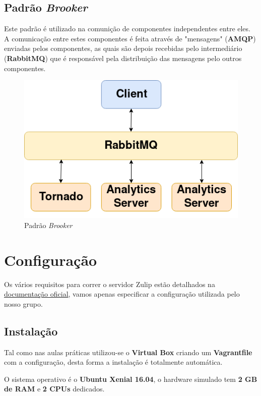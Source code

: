 \documentclass[11pt,a4paper]{report}%
\begin{document}
\section{Padrão \textit{Brooker}}

Este padrão é utilizado na comunição de componentes independentes entre eles. A comunicação entre estes componentes é feita através de "mensagens" (\textbf{AMQP}) enviadas pelos componentes, as quais são depois recebidas pelo intermediário (\textbf{RabbitMQ}) que é responsável pela distribuição das mensagens pelo outros componentes. 

\begin{figure}[H]
	\centering
	\includegraphics[scale=0.50]{broker.png}
	\caption{Padrão \textit{Brooker}}
	\label{img:brooker}
\end{figure}

\chapter{Configuração}

Os vários requisitos para correr o servidor Zulip estão detalhados na \href{https://zulip.readthedocs.io/en/latest/production/requirements.html}{documentação oficial}, vamos apenas especificar a configuração utilizada pelo nosso grupo.

\section{Instalação}

Tal como nas aulas práticas utilizou-se o \textbf{Virtual Box} criando um \textbf{Vagrantfile} com a configuração, desta forma a instalação é totalmente automática.

O sistema operativo é o  \textbf{Ubuntu Xenial 16.04}, o hardware simulado tem  \textbf{2 GB de RAM} e  \textbf{2 CPUs} dedicados. 
\end{document}
